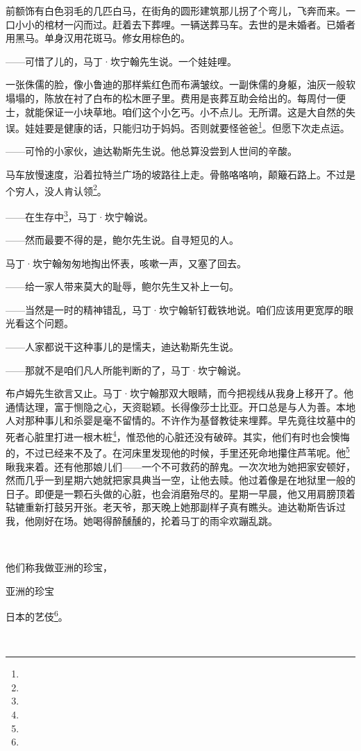 \par 前额饰有白色羽毛的几匹白马，在街角的圆形建筑那儿拐了个弯儿，飞奔而来。一口小小的棺材一闪而过。赶着去下葬哩。一辆送葬马车。去世的是未婚者。已婚者用黑马。单身汉用花斑马。修女用棕色的。
\par ——可惜了儿的，马丁·坎宁翰先生说。一个娃娃哩。
\par 一张侏儒的脸，像小鲁迪的那样紫红色而布满皱纹。一副侏儒的身躯，油灰一般软塌塌的，陈放在衬了白布的松木匣子里。费用是丧葬互助会给出的。每周付一便士，就能保证一小块草地。咱们这个小乞丐。小不点儿。无所谓。这是大自然的失误。娃娃要是健康的话，只能归功于妈妈。否则就要怪爸爸\footnote{}。但愿下次走点运。
\par ——可怜的小家伙，迪达勒斯先生说。他总算没尝到人世间的辛酸。
\par 马车放慢速度，沿着拉特兰广场的坡路往上走。骨骼咯咯响，颠簸石路上。不过是个穷人，没人肯认领\footnote{}。
\par ——在生存中\footnote{}，马丁·坎宁翰说。
\par ——然而最要不得的是，鲍尔先生说。自寻短见的人。
\par 马丁·坎宁翰匆匆地掏出怀表，咳嗽一声，又塞了回去。
\par ——给一家人带来莫大的耻辱，鲍尔先生又补上一句。
\par ——当然是一时的精神错乱，马丁·坎宁翰斩钉截铁地说。咱们应该用更宽厚的眼光看这个问题。
\par ——人家都说干这种事儿的是懦夫，迪达勒斯先生说。
\par ——那就不是咱们凡人所能判断的了，马丁·坎宁翰说。
\par 布卢姆先生欲言又止。马丁·坎宁翰那双大眼睛，而今把视线从我身上移开了。他通情达理，富于恻隐之心，天资聪颖。长得像莎士比亚。开口总是与人为善。本地人对那种事儿和杀婴是毫不留情的。不许作为基督教徒来埋葬。早先竟往坟墓中的死者心脏里打进一根木桩\footnote{}，惟恐他的心脏还没有破碎。其实，他们有时也会懊悔的，不过已经来不及了。在河床里发现他的时候，手里还死命地攥住芦苇呢。他\footnote{}瞅我来着。还有他那娘儿们——一个不可救药的醉鬼。一次次地为她把家安顿好，然而几乎一到星期六她就把家具典当一空，让他去赎。他过着像是在地狱里一般的日子。即便是一颗石头做的心脏，也会消磨殆尽的。星期一早晨，他又用肩膀顶着轱辘重新打鼓另开张。老天爷，那天晚上她那副样子真有瞧头。迪达勒斯告诉过我，他刚好在场。她喝得醉醺醺的，抡着马丁的雨伞欢蹦乱跳。
\par  
\par 他们称我做亚洲的珍宝，
\par 亚洲的珍宝
\par 日本的艺伎\footnote{}。
\par  
